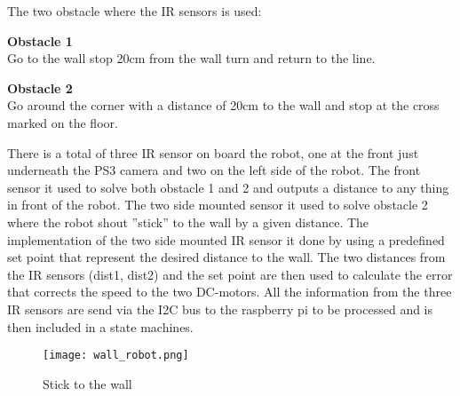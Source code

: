 The two obstacle where the IR sensors is used:
\begin{itemize}
	\begin{item}
		\textbf{ Obstacle 1}\\ Go to the wall stop 20cm from the wall turn and return to the line.
	\end{item}
	
	\begin{item}
		\textbf{ Obstacle 2}\\Go around the corner with a distance of 20cm to the wall and stop at the cross marked on the floor. 
	\end{item}
\end{itemize}

There is a total of three IR sensor on board the robot, one at the front just underneath the PS3 camera and two on the left side of the robot. The front sensor it used to solve both obstacle 1 and 2 and outputs a distance to any thing in front of the robot. The two side mounted sensor it used to solve obstacle 2 where the robot shout ''stick'' to the wall by a given distance. 
The implementation of the two side mounted IR sensor it done by using a predefined set point that represent the desired distance to the wall. The two distances from the IR sensors (dist1, dist2) and the set point are then used to calculate the error that corrects the speed to the two DC-motors. All the information from the three IR sensors are send via the I2C bus to the raspberry pi to be processed and is then included in a state machines.
  \begin{figure}[!h!]
	\centering
	\texttt{[image: wall\_robot.png]}
	\caption{Stick to the wall}
	\label{fig:3}
\end{figure}

\newpage

      





